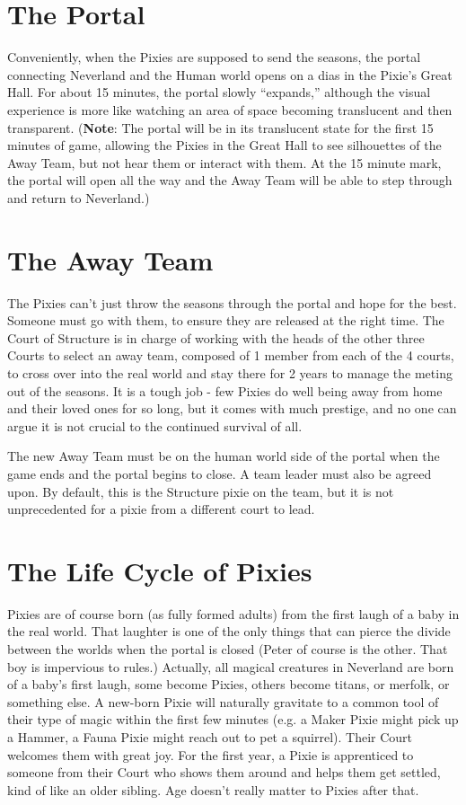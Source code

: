 \documentclass[blue]{PP}
\begin{document}
\section*{The Portal}
Conveniently, when the Pixies are supposed to send the seasons, the portal connecting Neverland and the Human world opens on a dias in the Pixie’s Great Hall. For about 15 minutes, the portal slowly “expands,” although the visual experience is more like watching an area of space becoming translucent and then transparent. (\textbf{Note}: The portal will be in its translucent state for the first 15 minutes of game, allowing the Pixies in the Great Hall to see silhouettes of the Away Team, but not hear them or interact with them. At the 15 minute mark, the portal will open all the way and the Away Team will be able to step through and return to Neverland.)

\section*{The Away Team}
The Pixies can’t just throw the seasons through the portal and hope for the best. Someone must go with them, to ensure they are released at the right time. The Court of Structure is in charge of working with the heads of the other three Courts to select an away team, composed of 1  member from each of the 4 courts, to cross over into the real world and stay there for 2 years to manage the meting out of the seasons. It is a tough job - few Pixies do well being away from home and their loved ones for so long, but it comes with much prestige, and no one can argue it is not crucial to the continued survival of all.

The new Away Team must be on the human world side of the portal when the game ends and the portal begins to close. A team leader must also be agreed upon. By default, this is the Structure pixie on the team, but it is not unprecedented for a pixie from a different court to lead.

\section*{The Life Cycle of Pixies}
Pixies are of course born (as fully formed adults) from the first laugh of a baby in the real world. That laughter is one of the only things that can pierce the divide between the worlds when the portal is closed (Peter of course is the other. That boy is impervious to rules.) Actually, all magical creatures in Neverland are born of a baby’s first laugh, some become Pixies, others become titans, or merfolk, or something else. A new-born Pixie will naturally gravitate to a common tool of their type of magic within the first few minutes (e.g. a Maker Pixie might pick up a Hammer, a Fauna Pixie might reach out to pet a squirrel). Their Court welcomes them with great joy. For the first year, a Pixie is apprenticed to someone from their Court who shows them around and helps them get settled, kind of like an older sibling. Age doesn’t really matter to Pixies after that. 
\end{document}

